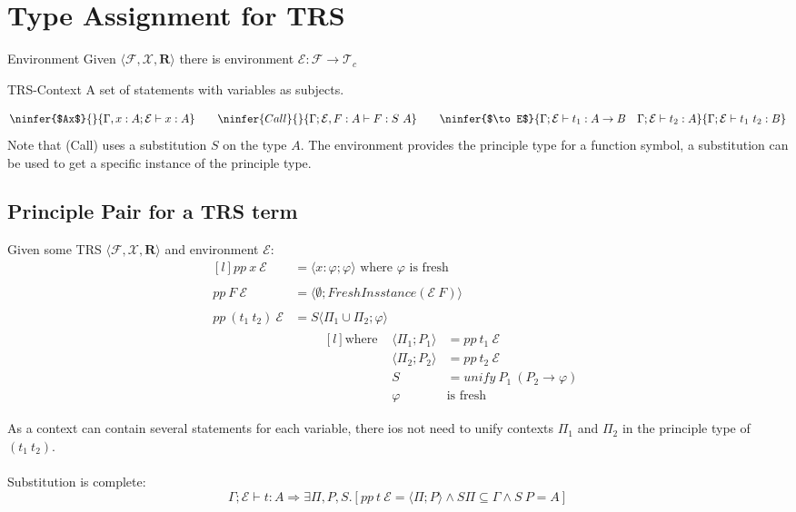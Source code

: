 \section{Type Assignment for TRS}
\begin{tcbraster}[raster columns=2,raster equal height]
    \begin{definitionbox}{Environment}
        Given $\langle \mathcal{F}, \mathcal{X}, \mathbf{R} \rangle$ there is environment $\mathcal{E} : \mathcal{F} \to \mathcal{T}_c$
    \end{definitionbox}
    \begin{definitionbox}{TRS-Context}
        A set of statements with variables as subjects.
    \end{definitionbox}
\end{tcbraster}
\[\ninfer{$Ax$}{}{\Gamma, x:A ; \mathcal{E} \vdash x : A} \qquad \ninfer{Call}{}{\Gamma; \mathcal{E}, F:A \vdash F : S \ A} \qquad \ninfer{$\to E$}{\Gamma;\mathcal{E} \vdash t_1 : A \to B \quad \Gamma;\mathcal{E} \vdash t_2 : A}{\Gamma ; \mathcal{E} \vdash t_1 \ t_2 : B}\]
Note that (Call) uses a substitution $S$ on the type $A$. The environment provides the principle type for a function symbol, a substitution can be used to get a specific instance of the principle type.

\subsection{Principle Pair for a TRS term}
Given some TRS $\langle \mathcal{F}, \mathcal{X}, \mathbf{R} \rangle$ and environment $\mathcal{E}$:
\[\begin{matrix*}[l]
    pp \ x \ \mathcal{E} & = \langle x:\varphi; \varphi \rangle \text{ where } \varphi \text{ is fresh} \\
    \\
    pp \ F \ \mathcal{E} & = \langle \emptyset; FreshInsstance (\mathcal{E} \ F) \rangle \\
    \\
    pp \ (t_1 \ t_2) \ \mathcal{E} & = S \langle \Pi_1 \cup \Pi_2 ; \varphi \rangle \\
    & \qquad \begin{matrix*}[l]
        \text{where } & \langle \Pi_1 ; P_1 \rangle & = pp \ t_1 \ \mathcal{E} \\
        & \langle \Pi_2 ; P_2 \rangle & = pp \ t_2 \ \mathcal{E} \\
        & S & = unify \ P_1 \ (P_2 \to \varphi) \\
        & \varphi & \text{is fresh} \\
    \end{matrix*} \\
\end{matrix*}\]
As a context can contain several statements for each variable, there ios not need to unify contexts $\Pi_1$ and $\Pi_2$ in the principle type of $(t_1 \ t_2)$.
\\
\\ Substitution is complete:
\[\Gamma ; \mathcal{E} \vdash t : A \Rightarrow \exists \Pi, P, S . [pp \ t \ \mathcal{E} = \langle \Pi ; P \rangle \land S \Pi \subseteq \Gamma \land S \ P = A]\]

